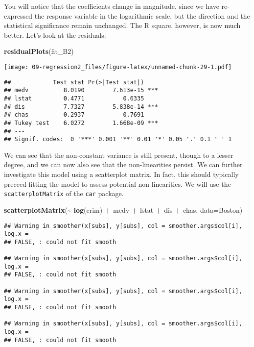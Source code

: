 \documentclass[
]{book}
\newenvironment{Shaded}{\begin{snugshade}}{\end{snugshade}}
\newcommand{\AttributeTok}[1]{\textcolor[rgb]{0.13,0.29,0.53}{#1}}
\newcommand{\FunctionTok}[1]{\textcolor[rgb]{0.13,0.29,0.53}{\textbf{#1}}}
\newcommand{\NormalTok}[1]{#1}
\newcommand{\SpecialCharTok}[1]{\textcolor[rgb]{0.81,0.36,0.00}{\textbf{#1}}}
\begin{document}
You will notice that the coefficients change in magnitude, since we have re-expressed the response variable in the logarithmic scale, but the direction and the statistical significance remain unchanged. The R square, however, is now much better. Let's look at the residuals:

\begin{Shaded}
\begin{Highlighting}[]
\FunctionTok{residualPlots}\NormalTok{(fit\_B2)}
\end{Highlighting}
\end{Shaded}

\texttt{[image: 09-regression2\_files/figure-latex/unnamed-chunk-29-1.pdf]}

\begin{verbatim}
##            Test stat Pr(>|Test stat|)    
## medv          8.0190        7.613e-15 ***
## lstat         0.4771           0.6335    
## dis           7.7327        5.838e-14 ***
## chas          0.2937           0.7691    
## Tukey test    6.0272        1.668e-09 ***
## ---
## Signif. codes:  0 '***' 0.001 '**' 0.01 '*' 0.05 '.' 0.1 ' ' 1
\end{verbatim}

We can see that the non-constant variance is still present, though to a lesser degree, and we can now also see that the non-linearities persist. We can further investigate this model using a scatterplot matrix. In fact, this should typically preceed fitting the model to assess potential non-linearities. We will use the \texttt{scatterplotMatrix} of the \texttt{car} package.

\begin{Shaded}
\begin{Highlighting}[]
\FunctionTok{scatterplotMatrix}\NormalTok{(}\SpecialCharTok{\textasciitilde{}} \FunctionTok{log}\NormalTok{(crim) }\SpecialCharTok{+}\NormalTok{ medv }\SpecialCharTok{+}\NormalTok{ lstat }\SpecialCharTok{+}\NormalTok{ dis }\SpecialCharTok{+}\NormalTok{ chas, }\AttributeTok{data=}\NormalTok{Boston)}
\end{Highlighting}
\end{Shaded}

\begin{verbatim}
## Warning in smoother(x[subs], y[subs], col = smoother.args$col[i], log.x =
## FALSE, : could not fit smooth

## Warning in smoother(x[subs], y[subs], col = smoother.args$col[i], log.x =
## FALSE, : could not fit smooth

## Warning in smoother(x[subs], y[subs], col = smoother.args$col[i], log.x =
## FALSE, : could not fit smooth

## Warning in smoother(x[subs], y[subs], col = smoother.args$col[i], log.x =
## FALSE, : could not fit smooth
\end{verbatim}
\end{document}
